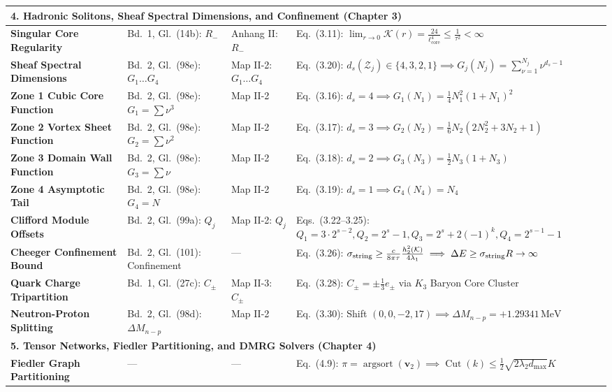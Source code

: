 \documentclass[
    12pt,
    a4paper,
    headings=normal,
    twoside=false,
    open=any,
    parskip=half
]{scrbook}
\let\hbar\relax
\begin{document}
\begin{longtable}{p{3.4cm}p{3.2cm}p{3.2cm}p{5.4cm}}
\multicolumn{4}{l}{\textsf{\textbf{\color{maincolor!90!black}4. Hadronic Solitons, Sheaf Spectral Dimensions, and Confinement (Chapter 3)}}} \\\midrule
\textbf{Singular Core Regularity} & Bd.~1, Gl.~(14b): $R_-$ & Anhang II: $R_-$ & Eq.~(3.11): $\lim_{r\to 0} \mathcal{K}(r) = \frac{24}{\ell_{\text{core}}^4} \le \frac{1}{\tau^2} < \infty$ \\
\textbf{Sheaf Spectral Dimensions} & Bd.~2, Gl.~(98e): $G_1 \dots G_4$ & Map II-2: $G_1 \dots G_4$ & Eq.~(3.20): $d_s(\mathcal{Z}_j) \in \{4, 3, 2, 1\} \implies G_j(N_j) = \sum_{\nu=1}^{N_j} \nu^{d_s - 1}$ \\
\textbf{Zone 1 Cubic Core Function} & Bd.~2, Gl.~(98e): $G_1 = \sum \nu^3$ & Map II-2 & Eq.~(3.16): $d_s = 4 \implies G_1(N_1) = \frac{1}{4}N_1^2(1 + N_1)^2$ \\
\textbf{Zone 2 Vortex Sheet Function}& Bd.~2, Gl.~(98e): $G_2 = \sum \nu^2$ & Map II-2 & Eq.~(3.17): $d_s = 3 \implies G_2(N_2) = \frac{1}{6}N_2(2N_2^2 + 3N_2 + 1)$ \\
\textbf{Zone 3 Domain Wall Function} & Bd.~2, Gl.~(98e): $G_3 = \sum \nu$ & Map II-2 & Eq.~(3.18): $d_s = 2 \implies G_3(N_3) = \frac{1}{2}N_3(1 + N_3)$ \\
\textbf{Zone 4 Asymptotic Tail} & Bd.~2, Gl.~(98e): $G_4 = N$ & Map II-2 & Eq.~(3.19): $d_s = 1 \implies G_4(N_4) = N_4$ \\
\textbf{Clifford Module Offsets} & Bd.~2, Gl.~(99a): $Q_j$ & Map II-2: $Q_j$ & Eqs.~(3.22--3.25): $Q_1 = 3\cdot 2^{s-2}, Q_2 = 2^s-1, Q_3 = 2^s+2(-1)^k, Q_4 = 2^{s-1}-1$ \\
\textbf{Cheeger Confinement Bound} & Bd.~2, Gl.~(101): Confinement & — & Eq.~(3.26): $\sigma_{\text{string}} \ge \frac{\hbar c}{8\pi\tau}\frac{h_2^2(\mathcal{K})}{4\lambda_1} \implies \Delta E \ge \sigma_{\text{string}} R \to \infty$ \\
\textbf{Quark Charge Tripartition} & Bd.~1, Gl.~(27c): $C_\pm$ & Map II-3: $C_\pm$ & Eq.~(3.28): $C_\pm = \pm\frac{1}{3}e_\pm$ via $K_3$ Baryon Core Cluster \\
\textbf{Neutron-Proton Splitting} & Bd.~2, Gl.~(98d): $\Delta M_{n-p}$ & Map II-2 & Eq.~(3.30): Shift $(0,0,-2,17) \implies \Delta M_{n-p} = +1.29341\,\text{MeV}$ \\\midrule
\multicolumn{4}{l}{\textsf{\textbf{\color{maincolor!90!black}5. Tensor Networks, Fiedler Partitioning, and DMRG Solvers (Chapter 4)}}} \\\midrule
\textbf{Fiedler Graph Partitioning} & — & — & Eq.~(4.9): $\pi = \operatorname{argsort}(\mathbf{v}_2) \implies \operatorname{Cut}(k) \le \frac{1}{2}\sqrt{2\lambda_2 d_{\max}} K$ \\

\end{longtable}
\end{document}
